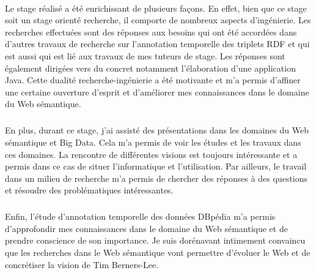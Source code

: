 \paragraph{}
Le stage réalisé a été enrichissant de plusieurs façons. En effet, bien que ce stage soit un stage orienté recherche, il comporte de nombreux aspects d'ingénierie. Les recherches effectuées sont des réponses aux besoins qui ont été accordées dans d'autres travaux de recherche sur l'annotation temporelle des triplets RDF et qui est aussi qui est lié aux travaux de mes tuteurs de stage. Les réponses sont également dirigées vers du concret notamment l'élaboration d'une application Java. Cette dualité recherche-ingénierie a été motivante et m'a permis d'affiner une certaine ouverture d'esprit et d'améliorer mes connaissances dans le domaine du Web sémantique.
\subparagraph{}
En plus, durant ce stage, j'ai assisté des présentations dans les domaines du Web sémantique et Big Data. Cela m'a permis de voir les études et les travaux dans ces domaines. La rencontre de différentes visions est toujours intéressante et a permis dans ce cas de situer l'informatique et l'utilisation. Par ailleurs, le travail dans un milieu de recherche m'a permis de chercher des réponses à des questions et résoudre des problématiques intéressantes.
\subparagraph{}
Enfin, l'étude d'annotation temporelle des données DBpédia m'a permis d'approfondir mes connaissances dans le domaine du Web sémantique et de prendre conscience de son importance. Je suis dorénavant intimement convaincu que les recherches dans le Web sémantique vont permettre d'évoluer le Web et de concrétiser la vision de Tim Berners-Lee.   
